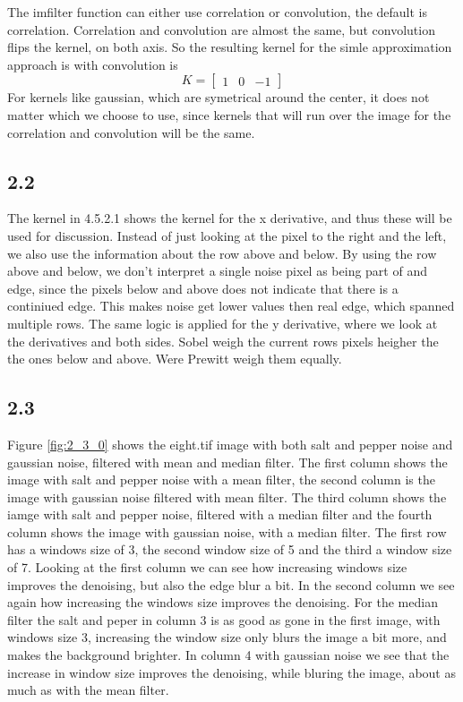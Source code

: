 \documentclass[11pt]{report}
\begin{document}
The imfilter function can either use correlation or convolution, the default is correlation. Correlation and convolution are almost the same, but convolution flips the kernel, on both axis. So the resulting kernel for the simle approximation approach is with convolution is
$$
K =
\begin{bmatrix}
  1 & 0 & -1
 \end{bmatrix}
$$
For kernels like gaussian, which are symetrical around the center, it does not matter which we choose to use, since kernels that will run over the image for the correlation and convolution will be the same.
\subsection{2.2}

The kernel in 4.5.2.1 shows the kernel for the x derivative, and thus these will be used for discussion. Instead of just looking at the pixel to the right and the left, we also use the information about the row above and below. By using the row above and below, we don't interpret a single noise pixel as being part of and edge, since the pixels below and above does not indicate that there is a continiued edge. This makes noise get lower values then real edge, which spanned multiple rows. The same logic is applied for the y derivative, where we look at the derivatives and both sides. Sobel weigh the current rows pixels heigher the the ones below and above. Were Prewitt weigh them equally.

\subsection{2.3}
Figure \ref{fig:2_3_0} shows the eight.tif image with both salt and pepper noise and gaussian noise, filtered with mean and median filter. The first column shows the image with salt and pepper noise with a mean filter, the second column is the image with gaussian noise filtered with mean filter. The third column shows the iamge with salt and pepper noise, filtered with a median filter and the fourth column shows the image with gaussian noise, with a median filter. The first row has a windows size of 3, the second window size of 5 and the third a window size of 7. Looking at the first column we can see how increasing windows size improves the denoising, but also the edge blur a bit. In the second column we see again how increasing the windows size improves the denoising. For the median filter the salt and peper in column 3 is as good as gone in the first image, with windows size 3, increasing the window size only blurs the image a bit more, and makes the background brighter. In column 4 with gaussian noise we see that the increase in window size improves the denoising, while bluring the image, about as much as with the mean filter.
\end{document}
